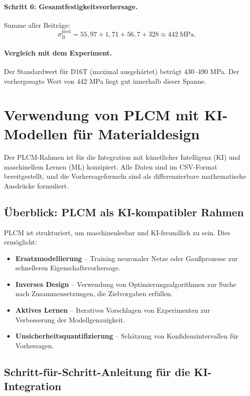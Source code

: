 \documentclass[12pt,a4paper]{article}
\begin{document}
\paragraph{Schritt 6: Gesamtfestigkeitsvorhersage.}
Summe aller Beiträge:
\[
\sigma_B^{\mathrm{pred}} = 55,97 + 1,71 + 56,7 + 328 \approx 442\ \text{MPa}.
\]

\paragraph{Vergleich mit dem Experiment.}
Der Standardwert für D16T (maximal ausgehärtet) beträgt 430–490 MPa. Der vorhergesagte Wert von 442 MPa liegt gut innerhalb dieser Spanne.

\section{Verwendung von PLCM mit KI-Modellen für Materialdesign}
\label{sec:ai-integration}

Der PLCM-Rahmen ist für die Integration mit künstlicher Intelligenz (KI) und maschinellem Lernen (ML) konzipiert. Alle Daten sind im CSV-Format bereitgestellt, und die Vorhersageformeln sind als differenzierbare mathematische Ausdrücke formuliert.

\subsection{Überblick: PLCM als KI-kompatibler Rahmen}

PLCM ist strukturiert, um maschinenlesbar und KI-freundlich zu sein. Dies ermöglicht:
\begin{itemize}
	\item \textbf{Ersatzmodellierung} – Training neuronaler Netze oder Gaußprozesse zur schnelleren Eigenschaftsvorhersage.
	\item \textbf{Inverses Design} – Verwendung von Optimierungsalgorithmen zur Suche nach Zusammensetzungen, die Zielvorgaben erfüllen.
	\item \textbf{Aktives Lernen} – Iteratives Vorschlagen von Experimenten zur Verbesserung der Modellgenauigkeit.
	\item \textbf{Unsicherheitsquantifizierung} – Schätzung von Konfidenzintervallen für Vorhersagen.
\end{itemize}

\subsection{Schritt-für-Schritt-Anleitung für die KI-Integration}
\end{document}
